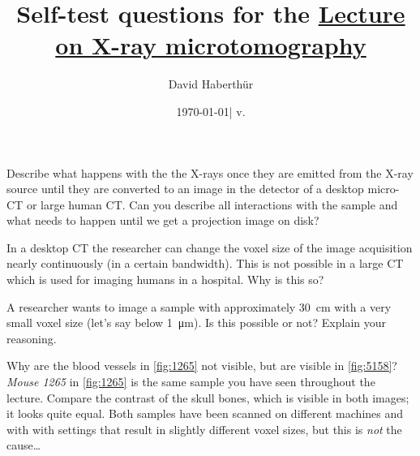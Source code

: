\documentclass[a4paper]{exam}
\title{Self-test questions for the \href{https://ilias.unibe.ch/goto_ilias3_unibe_sess_2466944.html}{Lecture on X-ray microtomography}}
\author{David Haberthür}
\date{\today\xspace| v. \gitAbbrevHash}
\newcommand{\uct}{{\textmu}CT\xspace}%
\begin{document}
\maketitle

\begin{questions}

\question Describe what happens with the the X-rays once they are emitted from the X-ray source until they are converted to an image in the detector of a desktop micro-CT or large human CT.
	Can you describe all interactions with the sample and what needs to happen until we get a projection image on disk?

\question In a desktop \uct the researcher can change the voxel size of the image acquisition nearly continuously (in a certain bandwidth).
	This is not possible in a large CT which is used for imaging humans in a hospital.
	Why is this so?

\question A researcher wants to image a sample with approximately \SI{30}{\centi\meter} with a very small voxel size (let's say below \SI{1}{\micro\meter}).
	Is this possible or not?
	Explain your reasoning.

\question Why are the blood vessels in \autoref{fig:1265} not visible, but are visible in \autoref{fig:5158}?
	\emph{Mouse 1265} in \autoref{fig:1265} is the same sample you have seen throughout the lecture.
	Compare the contrast of the skull bones, which is visible in both images; it looks quite equal.
	Both samples have been scanned on different machines and with with settings that result in slightly different voxel sizes, but this is \emph{not} the cause\ldots


\end{questions}
\end{document}
